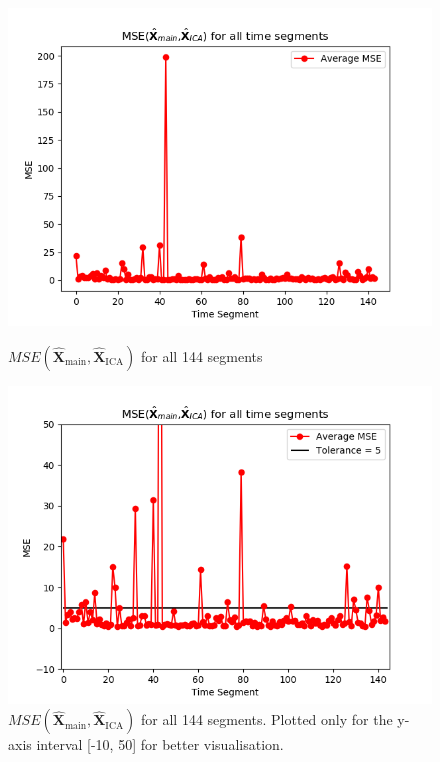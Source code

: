 \begin{figure}[H]
\begin{widepage}
    \begin{minipage}[t]{.45\textwidth}
		\centering
		\includegraphics[width=1\linewidth]{figures/ch_7/average_mse_non_removed_ica}
	\caption{$MSE\left(\hat{\mathbf{X}}_{\text{main}},\hat{\mathbf{X}}_{\text{ICA}}\right)$ for all 144 segments}
	\label{fig:M=N_1}
    \end{minipage} 
    \hspace{0.5cm}
    \begin{minipage}[t]{.45\textwidth}
        \centering
		\includegraphics[width=1\linewidth]{figures/ch_7/average_mse_non_removed_ica_zoom.png}
	\caption{$MSE\left(\hat{\mathbf{X}}_{\text{main}},\hat{\mathbf{X}}_{\text{ICA}}\right)$ for all 144 segments. Plotted only for the y-axis interval [-10, 50] for better visualisation.}
	\label{fig:M=N_1_2}
    \end{minipage}
\end{widepage}
\end{figure}
